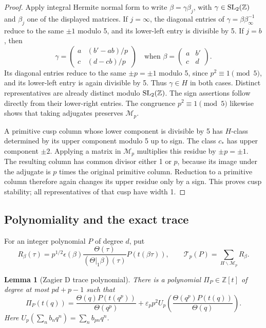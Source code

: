 \documentclass[11pt,a4paper]{article}
\newtheorem{lemma}[theorem]{Lemma}
\theoremstyle{definition}\newtheorem{definition}[theorem]{Definition}
\theoremstyle{remark}\newtheorem{remark}[theorem]{Remark}
\numberwithin{equation}{section}
\begin{document}
\begin{proof}
Apply integral Hermite normal form to write
\(\beta=\gamma\beta_j\), with \(\gamma\in{\rm SL}_2(\mathbb Z)\)
and \(\beta_j\) one of the displayed matrices.
If \(j=\infty\), the diagonal entries of
\(\gamma=\beta\beta_\infty^{-1}\) reduce to the same \(\pm1\)
modulo 5, and its lower-left entry is divisible by 5.
If \(j=b\), then
\[
 \gamma=
 \begin{pmatrix}
 a&(b'-ab)/p\\ c&(d-cb)/p
 \end{pmatrix}
 \quad\text{when }\beta=\begin{pmatrix}a&b'\\c&d\end{pmatrix}.
\]
Its diagonal entries reduce to the same \(\pm p=\pm1\)
modulo 5, since \(p^2\equiv1\pmod5\), and its lower-left
entry is again divisible by 5.  Thus \(\gamma\in H\) in both
cases.  Distinct representatives are already distinct modulo
\({\rm SL}_2(\mathbb Z)\).  The sign assertions follow directly
from their lower-right entries.  The congruence
\(p^2\equiv1\pmod5\) likewise shows that taking adjugates
preserves \(\mathcal M_p\).

A primitive cusp column whose lower component is divisible
by 5 has \(H\)-class determined by its upper component modulo
5 up to sign.  The class \(c_*\) has upper component \(\pm2\).
Applying a matrix in \(\mathcal M_p\) multiplies this residue
by \(\pm p=\pm1\).  The resulting column has common divisor
either 1 or \(p\), because its image under the adjugate is
\(p\) times the original primitive column.  Reduction to a
primitive column therefore again changes its upper residue
only by a sign.  This proves cusp stability; all representatives
of that cusp have width 1.
\end{proof}

\subsection{Polynomiality and the exact trace}

For an integer polynomial \(P\) of degree \(d\), put
\[
 R_\beta(\tau)
   =p^{1/2}\epsilon(\beta)
       \frac{\Theta(\tau)}{(\Theta|_1\beta)(\tau)}
       P(t(\beta\tau)),\qquad
 \mathcal T_p(P)=\sum_{H\backslash\mathcal M_p}R_\beta.
\]

\begin{lemma}[Zagier D trace polynomial]\label{E:lem:zagier-trace}
There is a polynomial \(\Pi_P\in\mathbb Z[t]\) of degree
at most \(pd+p-1\) such that
\begin{equation}\label{E:eq:zagier-trace}
 \Pi_P(t(q))
 =
 \frac{\Theta(q)P(t(q^p))}{\Theta(q^p)}
 +\varepsilon_p p^2 U_p
      \left(\frac{\Theta(q^p)P(t(q))}{\Theta(q)}\right).
\end{equation}
Here \(U_p(\sum_n b_nq^n)=\sum_n b_{pn}q^n\).
\end{lemma}
\end{document}

